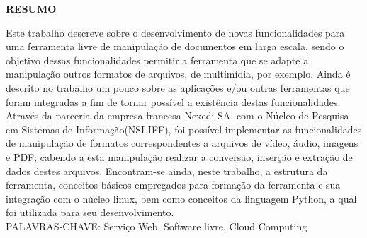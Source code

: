 \begin{center}
\textbf{RESUMO}
\end{center}
\singlespacing

\noindent Este trabalho descreve sobre o desenvolvimento de novas funcionalidades para uma ferramenta livre de manipulação de documentos em larga escala, sendo o objetivo dessas funcionalidades permitir a ferramenta que se adapte a manipulação outros formatos de arquivos, de multimídia, por exemplo. Ainda é descrito no trabalho um pouco sobre as aplicações e/ou outras ferramentas que foram integradas a fim de tornar possível a existência destas funcionalidades. Através da parceria da empresa francesa Nexedi SA, com o Núcleo de Pesquisa em Sistemas de Informação(NSI-IFF), foi possível implementar as funcionalidades de manipulação de formatos correspondentes a arquivos de vídeo, áudio, imagens e PDF; cabendo a esta manipulação realizar a conversão, inserção e extração de dados destes arquivos. Encontram-se ainda, neste trabalho, a estrutura da ferramenta, conceitos básicos empregados para formação da ferramenta e sua integração com o núcleo linux, bem como conceitos da linguagem Python, a qual foi utilizada para seu desenvolvimento. \\

\noindent PALAVRAS-CHAVE:  Serviço Web, Software livre, Cloud Computing
